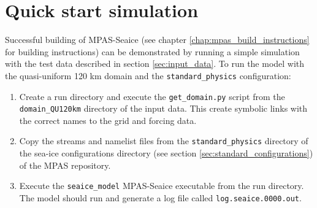 \section{Quick start simulation}
\label{sec:simple_simulations}

Successful building of MPAS-Seaice (see chapter \ref{chap:mpas_build_instructions} for building instructions) can be demonstrated by running a simple simulation with the test data described in section \ref{sec:input_data}. To run the model with the quasi-uniform 120 km domain and the \lstinline+standard_physics+ configuration:

\begin{enumerate}

\item Create a run directory and execute the \lstinline+get_domain.py+ script from the \lstinline+domain_QU120km+ directory of the input data. This create symbolic links with the correct names to the grid and forcing data.

\item Copy the streams and namelist files from the \lstinline+standard_physics+ directory of the sea-ice configurations directory (see section \ref{sec:standard_configurations}) of the MPAS repository.

\item Execute the \lstinline+seaice_model+ MPAS-Seaice executable from the run directory. The model should run and generate a log file called \lstinline+log.seaice.0000.out+.

\end{enumerate}

